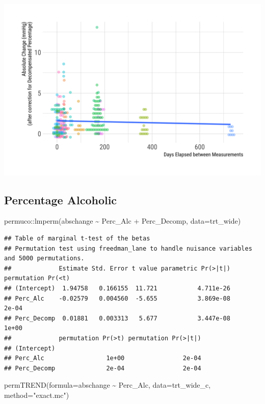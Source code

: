 \documentclass[
]{article}
\newenvironment{Shaded}{\begin{snugshade}}{\end{snugshade}}
\newcommand{\AttributeTok}[1]{\textcolor[rgb]{0.77,0.63,0.00}{#1}}
\newcommand{\FunctionTok}[1]{\textcolor[rgb]{0.00,0.00,0.00}{#1}}
\newcommand{\NormalTok}[1]{#1}
\newcommand{\SpecialCharTok}[1]{\textcolor[rgb]{0.00,0.00,0.00}{#1}}
\newcommand{\StringTok}[1]{\textcolor[rgb]{0.31,0.60,0.02}{#1}}
\begin{document}
\includegraphics{figures/unnamed-chunk-36-1.png}

\hypertarget{percentage-alcoholic}{%
\subsection{Percentage Alcoholic}\label{percentage-alcoholic}}

\begin{Shaded}
\begin{Highlighting}[]
\NormalTok{permuco}\SpecialCharTok{::}\FunctionTok{lmperm}\NormalTok{(abschange }\SpecialCharTok{\textasciitilde{}}\NormalTok{ Perc\_Alc }\SpecialCharTok{+}\NormalTok{ Perc\_Decomp, }\AttributeTok{data=}\NormalTok{trt\_wide)}
\end{Highlighting}
\end{Shaded}

\begin{verbatim}
## Table of marginal t-test of the betas
## Permutation test using freedman_lane to handle nuisance variables and 5000 permutations.
##             Estimate Std. Error t value parametric Pr(>|t|) permutation Pr(<t)
## (Intercept)  1.94758   0.166155  11.721           4.711e-26                   
## Perc_Alc    -0.02579   0.004560  -5.655           3.869e-08              2e-04
## Perc_Decomp  0.01881   0.003313   5.677           3.447e-08              1e+00
##             permutation Pr(>t) permutation Pr(>|t|)
## (Intercept)                                        
## Perc_Alc                 1e+00                2e-04
## Perc_Decomp              2e-04                2e-04
\end{verbatim}

\begin{Shaded}
\begin{Highlighting}[]
\FunctionTok{permTREND}\NormalTok{(}\AttributeTok{formula=}\NormalTok{abschange }\SpecialCharTok{\textasciitilde{}}\NormalTok{ Perc\_Alc, }\AttributeTok{data=}\NormalTok{trt\_wide\_c,}
          \AttributeTok{method=}\StringTok{"exact.mc"}\NormalTok{)}
\end{Highlighting}
\end{Shaded}
\end{document}
